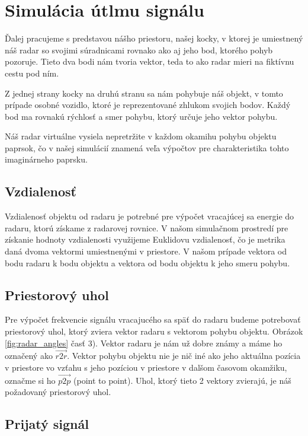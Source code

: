 \documentclass[slovak]{ExcelAtFIT} %
\begin{document}
  \section{Simulácia útlmu signálu}
    \hspace{0.6cm}Ďalej pracujeme s predstavou nášho priestoru, našej kocky, v ktorej je umiestnený náš radar so svojimi súradnicami rovnako ako aj jeho bod, ktorého pohyb pozoruje. Tieto dva bodi nám tvoria vektor, teda to ako radar mieri na fiktívnu cestu pod ním.

    Z jednej strany kocky na druhú stranu sa nám pohybuje náš objekt, v tomto prípade osobné vozidlo, ktoré je reprezentované zhlukom svojich bodov. Každý bod ma rovnakú rýchlosť a smer pohybu, ktorý určuje jeho vektor pohybu.

    Náš radar virtuálne vysiela nepretržite v každom okamihu pohybu objektu paprsok, čo v našej simulácií znamená veľa výpočtov pre charakteristika tohto imaginárneho paprsku.

    \subsection{Vzdialenosť}

      Vzdialenosť objektu od radaru je potrebné pre výpočet vracajúcej sa energie do radaru, ktorú získame z radar\-ovej rovnice.
      V našom simulačnom prostredí pre získanie hodnoty vzdialenosti využijeme Euklidovu vzdialenosť, čo je metrika daná dvoma vektormi umiestnenými v priestore.
      V našom prípade vektora od bodu radaru k bodu objektu a vektora od bodu objektu k jeho smeru pohybu.

    \subsection{Priestorový uhol}

      \hspace{0.6cm}Pre výpočet frekvencie signálu vracajucého sa späť do radaru budeme potrebovať priestorový uhol, ktorý zviera vektor radaru s vektorom pohybu objektu. Obrá\-zok \ref{fig:radar_angles} časť 3).
      Vektor radaru je nám už dobre známy a máme ho označený ako $\overrightarrow{r2r}$. Vektor pohybu objektu nie je nič iné ako jeho aktuálna pozícia v priestore vo vzťahu s jeho pozíciou v priestore v dalšom časovom okamžiku, označme si ho $\overrightarrow{p2p}$ (point to point).
      Uhol, ktorý tieto 2 vektory zvierajú, je náš požadovaný priesto\-rový uhol.

    \subsection{Prijatý signál}
\end{document}
